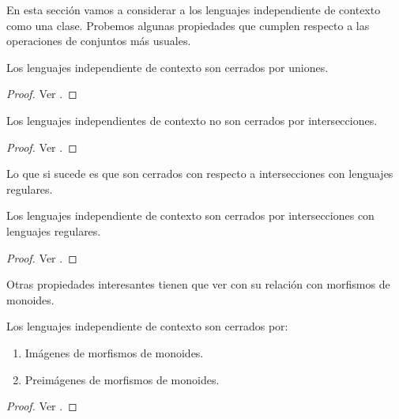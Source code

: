 \documentclass[tesis.tex]{subfiles}
\newcommand{\ic}{independiente de contexto }
\begin{document}
En esta sección vamos a considerar a los lenguajes \ic como una clase. 
Probemos algunas propiedades que cumplen respecto a las operaciones de conjuntos más usuales.

\begin{prop}
	Los lenguajes \ic son cerrados por uniones.
\end{prop}
\begin{proof}
	Ver \cite{hopcraft-ullman}.
\end{proof}

\begin{prop}
	Los lenguajes independientes de contexto no son cerrados por intersecciones.
\end{prop}

\begin{proof}
	Ver \cite{hopcraft-ullman}.
\end{proof}

Lo que si sucede es que son cerrados con respecto a intersecciones con lenguajes regulares.

\begin{prop}\label{intersecciones-reg-ic}
	Los lenguajes \ic son cerrados por intersecciones con lenguajes regulares.
\end{prop}

\begin{proof}
	Ver \cite{hopcraft-ullman}.
\end{proof}

Otras propiedades interesantes tienen que ver con su relación con morfismos de monoides. 

\begin{prop}\label{morfismos-monoides-ic}
	Los lenguajes \ic son cerrados por:
	\begin{enumerate}
		\item Imágenes de morfismos de monoides.
		\item Preimágenes de morfismos de monoides.
	\end{enumerate}
\end{prop}

\begin{proof}
	Ver \cite{sipser13}.
\end{proof}
\end{document}
